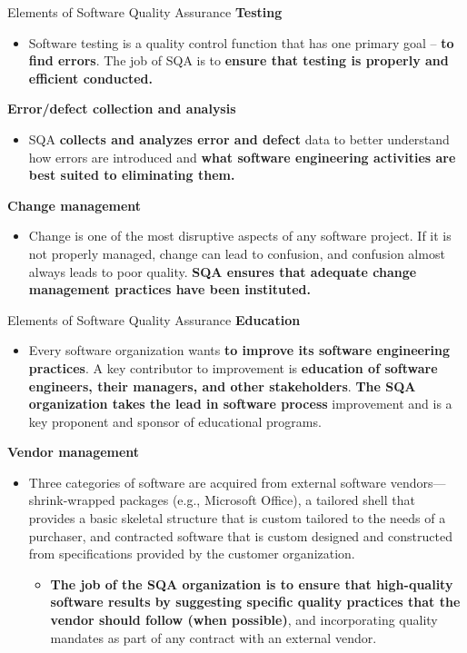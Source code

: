 \documentclass{beamer}
\begin{document}
\begin{frame}{Elements of Software Quality Assurance}
	\textbf{Testing}
	\begin{itemize}
		\item Software testing is a quality control function that has one primary goal – \textbf{to find errors}. The job of SQA is to \textbf{ensure that testing is properly and efficient conducted.}
		
	\end{itemize}
	\textbf{Error/defect collection and analysis}
	\begin{itemize}
		\item SQA \textbf{collects and analyzes error and defect} data to better understand how errors are introduced and \textbf{what software engineering activities are best suited to eliminating them.}
	\end{itemize}
\textbf{Change management}
\begin{itemize}
	\item Change is one of the most disruptive aspects of any software project. If it is not properly managed, change can lead to confusion, and confusion almost always leads to poor quality. \textbf{SQA ensures that adequate change management practices have been instituted.}
\end{itemize}
\end{frame}
\begin{frame}{Elements of Software Quality Assurance}
	\textbf{Education}
	\begin{itemize}
		\item Every software organization wants \textbf{to improve its software engineering practices}. A key contributor to improvement is \textbf{education of software engineers, their managers, and other stakeholders}. \textbf{The SQA organization takes the lead in software process} improvement and is a key proponent and sponsor of educational programs.	
	\end{itemize}
	\textbf{Vendor management}
	\begin{itemize}
		\item Three categories of software are acquired from external software vendors— shrink-wrapped packages (e.g., Microsoft Office), a tailored shell  that provides a basic skeletal structure that is custom tailored to the needs of a purchaser, and contracted software that is custom designed and constructed from specifications provided by the customer organization. 
		\begin{itemize}
			\item \textbf{The job of the SQA organization is to ensure that high-quality software results by suggesting specific quality practices that the vendor should follow (when possible)}, and incorporating quality mandates as part of any contract with an external vendor.
		\end{itemize}
	\end{itemize}
\end{frame}
\end{document}
